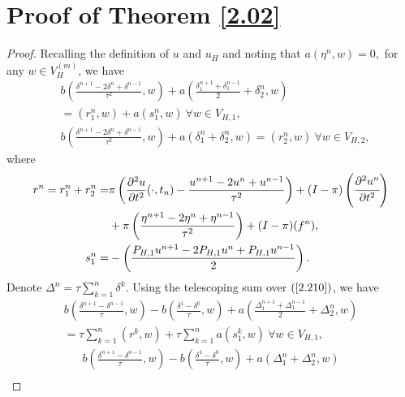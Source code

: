 \documentclass[preprint,12pt]{elsarticle}
\begin{document}
\section{Proof of Theorem \ref{2.02}}\label{appd}
\begin{proof}
Recalling the definition of $u$ and $u_H$ and noting that $a(\eta^n,w)=0,$ for any $w\in V_H^{(m)}$, we have
\begin{equation}\label{2.210}
\begin{aligned}
     &b\left(\frac{\delta^{n+1}-2\delta^n+\delta^{n-1}}{\tau^2},w\right)+a\left(\frac{\delta_1^{n+1}+\delta_1^{n-1}}{2}+\delta_2^n,w\right)\\
     &=(r_1^n,w)+a(s_1^n,w)~\forall w\in V_{H,1},\\
     &b\left(\frac{\delta^{n+1}-2\delta^n+\delta^{n-1}}{\tau^2},w\right)+a\left(\delta_1^{n}+\delta_2^{n},w\right)=(r_2^n,w)~\forall w\in V_{H,2},
\end{aligned}
\end{equation}
where 
\begin{equation}\label{2.220}
\begin{aligned}
     r^n=r_1^n+r_2^n=&\pi\left(\frac{\partial^2u}{\partial t^2}(\cdot,t_n)-\frac{u^{n+1}-2u^n+u^{n-1}}{\tau^2}\right) + (I-\pi)\left(\cfrac{\partial^2u^n}{\partial t^2}\right)\\
     &+\pi\left(\frac{\eta^{n+1}-2\eta^n+\eta^{n-1}}{\tau^2}\right)+(I-\pi)(f^n),\\
     s_1^n=&-\left(\frac{P_{H,1}u^{n+1}-2P_{H,1}u^n+P_{H,1}u^{n-1}}{2}\right).
\end{aligned}
\end{equation}
    Denote $\Delta^n=\tau\sum_{k=1}^n\delta^k.$ Using the telescoping sum over $(\ref{2.210})$, we have 
\begin{equation}\label{2.5}
\begin{aligned}
     b\left(\frac{\delta^{n+1}-\delta^{n-1}}{\tau},w\right)-b\left(\frac{\delta^{1}-\delta^{0}}{\tau},w\right)+a\left(\frac{\Delta_1^{n+1}+\Delta_1^{n-1}}{2}+\Delta_2^{n},w\right)\\
     =\tau\sum_{k=1}^n(r^k,w)+\tau\sum_{k=1}^n a(s_1^k,w)~\forall w\in V_{H,1},
\end{aligned}
\end{equation}
\begin{equation}\label{2.6}
\begin{aligned}
     b\left(\frac{\delta^{n+1}-\delta^{n-1}}{\tau},w\right)-b\left(\frac{\delta^{1}-\delta^{0}}{\tau},w\right)+a\left(\Delta_1^{n}+\Delta_2^{n},w\right)\\

\end{aligned}
\end{equation}
\end{proof}
\end{document}
